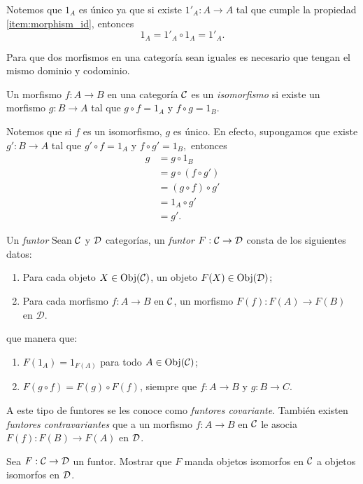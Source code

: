 Notemos que $1_A$ es único ya que si existe $1'_A:A\to A$ tal que cumple la propiedad \ref{item:morphism_id}, entonces 
\[
1_A=1'_A\circ 1_A=1'_A.
\]
\begin{nota}
    Para que dos morfismos en una categoría sean iguales es necesario que tengan el mismo dominio y codominio.
\end{nota}
\begin{definicion}
    Un morfismo $f:A\to B$ en una categoría $\mathcal{C}$ es un \textit{isomorfismo} si existe un morfismo $g:B\to A$ tal que $g\circ f=1_A$ y $f\circ g=1_B$.
\end{definicion}
Notemos que si $f$ es un isomorfismo, $g$ es único. En efecto, supongamos que existe $g':B\to A$ tal que $g'\circ f=1_A$ y $f\circ g'=1_B,$ entonces 
\begin{equation*}
    \begin{split}
        g&=g\circ 1_B\\
        &=g\circ(f\circ g')\\
        &=(g\circ f)\circ  g'\\
        &=1_A\circ g'\\
        &=g'.
    \end{split}
\end{equation*}
\begin{definicion}
Un \textit{funtor}  Sean $\mathcal{C}$ y $\mathcal{D}$ categorías, un \textit{funtor} $F: \mathcal{C} \to \mathcal{D}$ consta de los siguientes datos:
\begin{enumerate}[label=(\arabic*)]
    \item Para cada objeto $X \in \mathrm{Obj}({\mathcal{C}})$, un objeto $F(X) \in \mathrm{Obj}({\mathcal{D}})$;
    \item Para cada morfismo $f: A \to B$ en ${\mathcal{C}}$, un morfismo $F(f): F(A) \to F(B)$ en ${\mathcal{D}}$.
\end{enumerate}
que manera que:
\begin{enumerate}
    \item$F(1_A) = 1_{F(A)}$ para todo $A \in \mathrm{Obj}({\mathcal{C}})$;
    \item $F(g \circ f) = F(g) \circ F(f)$, siempre que $f:A\to B$ y $g:B\to C$.
\end{enumerate}
A este tipo de funtores se les conoce como \textit{funtores covariante}. También existen \textit{funtores contravariantes} que a un morfismo $f:A\to B$ en $\mathcal{C}$ le asocia $F(f):F(B)\to F(A)$ en $\mathcal{D}$.
\end{definicion}
\begin{ejercicio}
    Sea $F:\mathcal{C}\to\mathcal{D}$ un funtor. Mostrar que $F$ manda objetos isomorfos en $\mathcal{C}$ a objetos isomorfos en $\mathcal{D}$.
\end{ejercicio}
